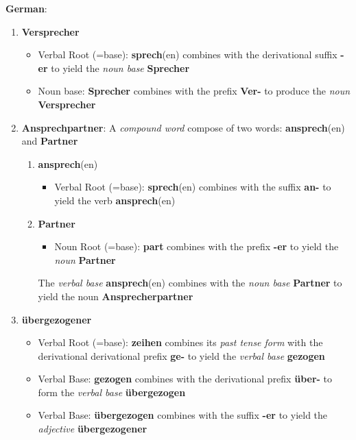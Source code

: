 \documentclass[11pt]{article}
\begin{document}
\begin{solution}
\textbf{German}:
\begin{enumerate}
	\item \textbf{Versprecher}
		\begin{itemize}
			\item Verbal Root (=base): \textbf{sprech}(en) combines with the derivational suffix \textbf{-er} to yield the \textit{noun base} \textbf{Sprecher}
			\item Noun base: \textbf{Sprecher} combines with the prefix \textbf{Ver-} to produce the \textit{noun} \textbf{Versprecher}
		\end{itemize}
	\item \textbf{Ansprechpartner}: A \textit{compound word} compose of two words: \textbf{ansprech}(en) and \textbf{Partner}
		\begin{enumerate}
			\item \textbf{ansprech}(en)
				\begin{itemize}
					\item Verbal Root (=base): \textbf{sprech}(en) combines with the suffix \textbf{an-} to yield the verb \textbf{ansprech}(en)
				\end{itemize}
			\item \textbf{Partner}
				\begin{itemize}
					\item Noun Root (=base): \textbf{part} combines with the prefix \textbf{-er} to yield the \textit{noun} \textbf{Partner}
				\end{itemize}
			The \textit{verbal base} \textbf{ansprech}(en) combines with the \textit{noun base} \textbf{Partner} to yield the noun \textbf{Ansprecherpartner}
		\end{enumerate}
	\item \textbf{{\"u}bergezogener}
		\begin{itemize}
			\item Verbal Root (=base): \textbf{zeihen} combines its \textit{past tense form} with the derivational derivational prefix \textbf{ge-} to yield the \textit{verbal base} \textbf{gezogen}
			\item Verbal Base: \textbf{gezogen} combines with the derivational prefix \textbf{{\"u}ber-} to form the \textit{verbal base} \textbf{{\"u}bergezogen}
			\item Verbal Base: \textbf{{\"u}bergezogen} combines with the suffix \textbf{-er} to yield the \textit{adjective} \textbf{{\"u}bergezogener} 
		\end{itemize}
\end{enumerate}
\end{solution}
\end{document}
